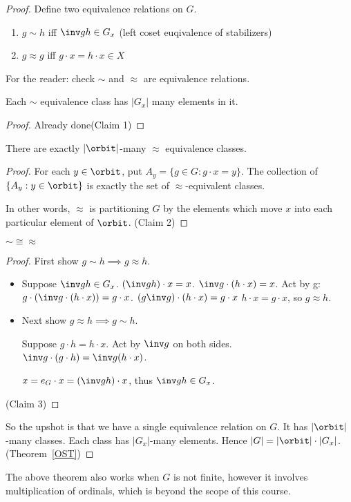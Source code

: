 \documentclass[notes.tex]{subfiles}
\begin{document}
\begin{proof}
	Define two equivalence relations on $G$.
	\begin{enumerate}
		\item $g\sim h$ iff $\inv gh \in G_x$ (left coset euqivalence of stabilizers)
		\item $g\approx g$ iff $g\cdot x = h\cdot x\in X$
	\end{enumerate}
	For the reader: check $\sim$ and $\approx$ are equivalence relations.

	\begin{claim}[1]
		Each $\sim$ equivalence class has $|G_x|$ many elements in it.
	\end{claim}
	\begin{proof}
		Already done\qedhere(Claim 1)
	\end{proof}
	\begin{claim}[2]
		There are exactly $|\orbit|$-many $\approx$ equivalence classes.
	\end{claim}
	\begin{proof}
		For each $y\in \orbit$, put $A_y = \{g\in G: g\cdot x = y\}$.
		The collection of $\{A_y : y\in\orbit\}$ is exactly  the set of $\approx$-equivalent classes.

		In other words, $\approx$ is partitioning $G$ by the elements which move $x$ into each particular element of $\orbit$.
		\qedhere(Claim 2)
	\end{proof}
	\begin{claim}[3]
		$\sim \cong \approx$
	\end{claim}
	\begin{proof}
		First show $g\sim h \implies g\approx h$.
		\begin{itemize}
			\item Suppose $\inv gh\in G_x$.
				$(\inv gh)\cdot x = x$.
				$\inv g \cdot (h \cdot x) = x$.
				Act by g: 
					$g\cdot (\inv g \cdot (h \cdot x)) = g\cdot x$.
					$(g\inv g)\cdot (h\cdot x) = g\cdot x$
					$h\cdot x = g\cdot x$, so $g\approx h$.
			\item Next show $g\approx h \implies g\sim h$.

			Suppose $g\cdot h = h \cdot x$. Act by $\inv g$ on both sides. $\inv g \cdot (g\cdot h) = \inv g (h\cdot x)$.

			$x = e_G\cdot x = (\inv gh)\cdot x$, thus $\inv gh \in G_x$.
		\end{itemize}
		\qedhere(Claim 3)
	\end{proof}
	So the upshot is that we have a single equivalence relation on $G$. It has $|\orbit|$ -many classes. Each class has $|G_x|$-many elements. Hence $|G| = |\orbit|\cdot|G_x|$.\qedhere(Theorem~\ref{OST})
\end{proof}

\begin{remark}
	The above theorem also works when $G$ is not finite, however it involves multiplication of ordinals, which is beyond the scope of this course.
\end{remark}
\end{document}
